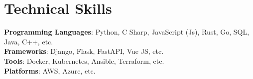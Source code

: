 \section{Technical Skills}
\begin{itemize}[leftmargin=0.15in, label={}]
    \small{\item{
                                        \textbf{Programming Languages}{: Python,                          C Sharp,                          JavaScript (Js),                          Rust,                          Go,                          SQL,                          Java,                          C++,  etc.                        }\\                                        \textbf{Frameworks}{: Django,                          Flask,                          FastAPI,                          Vue JS,  etc.                        }\\                                        \textbf{Tools}{: Docker,                          Kubernetes,                          Ansible,                          Terraform,  etc.                        }\\                                        \textbf{Platforms}{: AWS,                          Azure,  etc.                        }                                  }}
\end{itemize}
